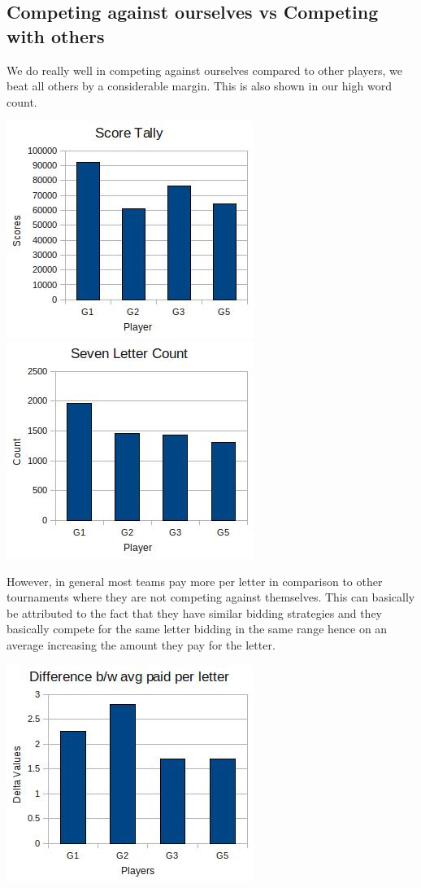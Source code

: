 \documentclass[11pt]{article}
\begin{document}
	\subsection{Competing against ourselves vs Competing with others}	
	We do really well in competing against ourselves compared to other players, we beat all others by a considerable margin. This is also shown in our high word count. 	
\begin{center}
\includegraphics[width=0.5 \textwidth]{AllPlayerScoreTally}
	\includegraphics[width=0.5 \textwidth]{AllplayerWordCount}
\end{center}
However, in general most teams pay more per letter in comparison to other tournaments where they are not competing against themselves. This can basically be attributed to the fact that they have similar bidding strategies and they basically compete for the same letter bidding in the same range hence on an average increasing the amount they pay for the letter. 
\begin{center}
\includegraphics[width=0.5 \textwidth]{ALLPlayer}
\end{center}
\end{document}
